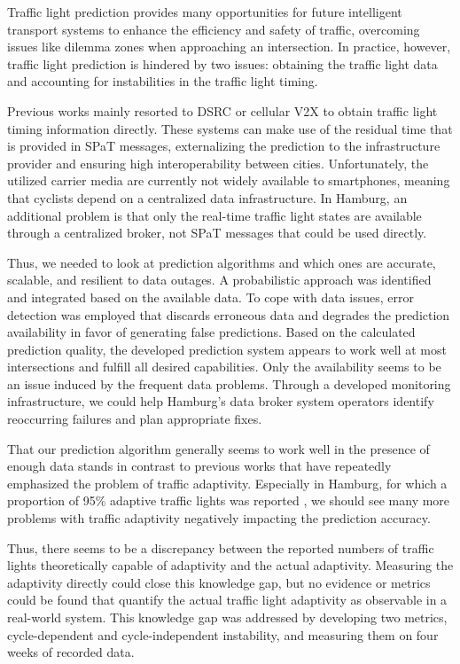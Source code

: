 Traffic light prediction provides many opportunities for future intelligent transport systems to enhance the efficiency and safety of traffic, overcoming issues like dilemma zones when approaching an intersection. In practice, however, traffic light prediction is hindered by two issues: obtaining the traffic light data and accounting for instabilities in the traffic light timing. 

Previous works mainly resorted to DSRC or cellular V2X to obtain traffic light timing information directly. These systems can make use of the residual time that is provided in SPaT messages, externalizing the prediction to the infrastructure provider and ensuring high interoperability between cities. Unfortunately, the utilized carrier media are currently not widely available to smartphones, meaning that cyclists depend on a centralized data infrastructure. In Hamburg, an additional problem is that only the real-time traffic light states are available through a centralized broker, not SPaT messages that could be used directly. 

Thus, we needed to look at prediction algorithms and which ones are accurate, scalable, and resilient to data outages. A probabilistic approach was identified and integrated based on the available data. To cope with data issues, error detection was employed that discards erroneous data and degrades the prediction availability in favor of generating false predictions. Based on the calculated prediction quality, the developed prediction system appears to work well at most intersections and fulfill all desired capabilities. Only the availability seems to be an issue induced by the frequent data problems. Through a developed monitoring infrastructure, we could help Hamburg's data broker system operators identify reoccurring failures and plan appropriate fixes. 

That our prediction algorithm generally seems to work well in the presence of enough data stands in contrast to previous works that have repeatedly emphasized the problem of traffic adaptivity. Especially in Hamburg, for which a proportion of 95\% adaptive traffic lights was reported \cite{bodenheimer_enabling_2014}, we should see many more problems with traffic adaptivity negatively impacting the prediction accuracy. 

Thus, there seems to be a discrepancy between the reported numbers of traffic lights theoretically capable of adaptivity and the actual adaptivity. Measuring the adaptivity directly could close this knowledge gap, but no evidence or metrics could be found that quantify the actual traffic light adaptivity as observable in a real-world system. This knowledge gap was addressed by developing two metrics, cycle-dependent and cycle-independent instability, and measuring them on four weeks of recorded data.

